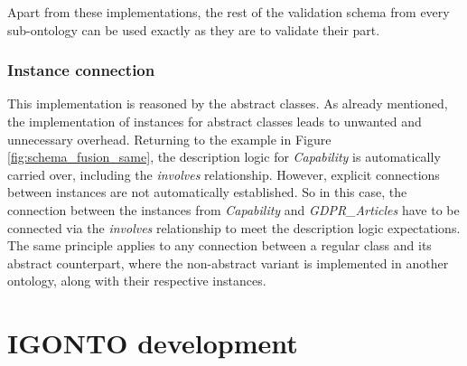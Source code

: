 \documentclass[
  a4paper,  %
  twoside,  %
  bibliography=totoc,
  headsepline,
  cleardoublepage=empty,
  parskip=half,
  draft=false
]{scrbook}
\begin{document}
Apart from these implementations, the rest of the validation schema from every sub-ontology can be used exactly as they are to validate their part.

\subsection{Instance connection}

This implementation is reasoned by the abstract classes. As already mentioned, the implementation of instances for abstract classes leads to unwanted and unnecessary overhead. Returning to the example in Figure \ref{fig:schema_fusion_same}, the description logic for \textit{Capability} is automatically carried over, including the \textit{involves} relationship. However, explicit connections between instances are not automatically established. So in this case, the connection between the instances from \textit{Capability} and \textit{GDPR\_Articles} have to be connected via the \textit{involves} relationship to meet the description logic expectations. The same principle applies to any connection between a regular class and its abstract counterpart, where the non-abstract variant is implemented in another ontology, along with their respective instances.



\chapter{IGONTO development}
\end{document}
